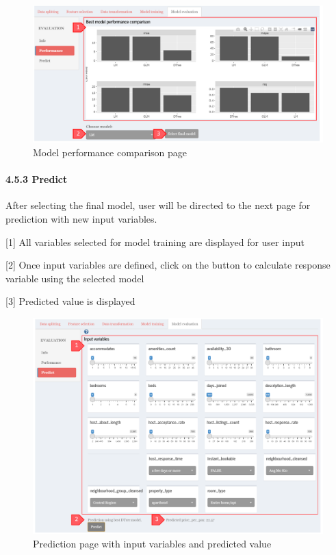 \documentclass[
  12pt,
]{article}
\begin{document}
\begin{figure}[H]

{\centering \includegraphics[width=0.95\linewidth]{images/mdleval2} 

}

\caption{Model performance comparison page}\label{fig:unnamed-chunk-27}
\end{figure}

\hypertarget{predict}{%
\paragraph{4.5.3 Predict}\label{predict}}

After selecting the final model, user will be directed to the next page
for prediction with new input variables.

{[}1{]} All variables selected for model training are displayed for user
input

{[}2{]} Once input variables are defined, click on the button to
calculate response variable using the selected model

{[}3{]} Predicted value is displayed

\begin{figure}[H]

{\centering \includegraphics[width=0.95\linewidth]{images/mdleval3} 

}

\caption{Prediction page with input variables and predicted value}\label{fig:unnamed-chunk-28}
\end{figure}
\end{document}
